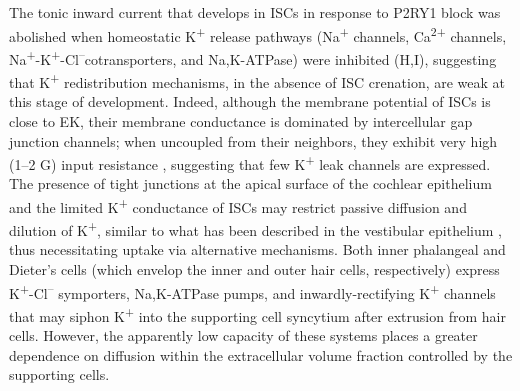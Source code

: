 \documentclass[9pt,lineno]{elife}
\begin{document}
The tonic inward current that develops in ISCs in response to P2RY1 block was abolished when homeostatic K\textsuperscript{+} release pathways (Na\textsuperscript{+} channels, Ca\textsuperscript{2+} channels, Na\textsuperscript{+}-K\textsuperscript{+}-Cl\textsuperscript{--}cotransporters, and Na,K-ATPase) were inhibited (H,I), suggesting that K\textsuperscript{+} redistribution mechanisms, in the absence of ISC crenation, are weak at this stage of development. Indeed, although the membrane potential of ISCs is close to EK, their membrane conductance is dominated by intercellular gap junction channels; when uncoupled from their neighbors, they exhibit very high (1--2 G\textohm) input resistance \citep{Jagger2014,Wang2015}, suggesting that few K\textsuperscript{+} leak channels are expressed. The presence of tight junctions at the apical surface of the cochlear epithelium and the limited K\textsuperscript{+} conductance of ISCs may restrict passive diffusion and dilution of K\textsuperscript{+}, similar to what has been described in the vestibular epithelium \citep{Contini2017}, thus necessitating uptake via alternative mechanisms. Both inner phalangeal and Dieter’s cells (which envelop the inner and outer hair cells, respectively) express K\textsuperscript{+}-Cl\textsuperscript{--} symporters, Na,K-ATPase pumps, and inwardly-rectifying K\textsuperscript{+} channels that may siphon K\textsuperscript{+} into the supporting cell syncytium after extrusion from hair cells. However, the apparently low capacity of these systems places a greater dependence on diffusion within the extracellular volume fraction controlled by the supporting cells. 
\end{document}
